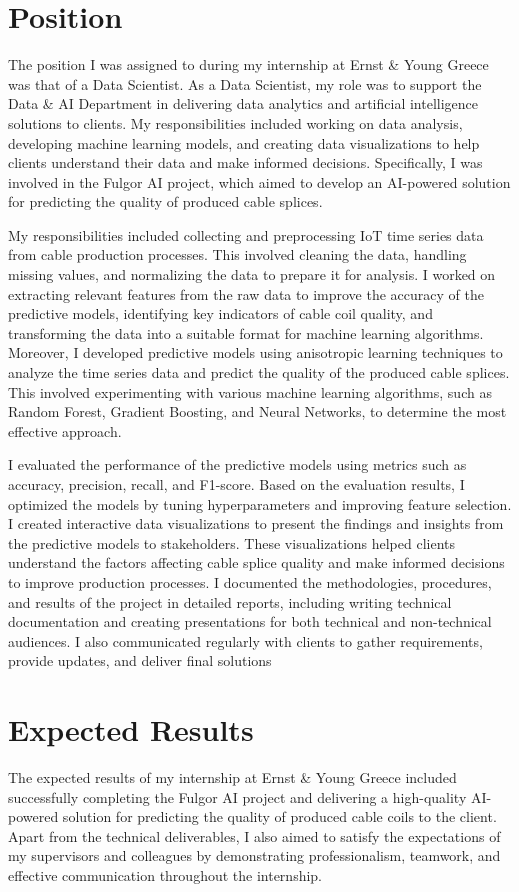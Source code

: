 \section{Position}

The position I was assigned to during my internship at Ernst \& Young Greece
was that of a Data Scientist. As a Data Scientist, my role was to support the
Data \& AI Department in delivering data analytics and artificial intelligence
solutions to clients. My responsibilities included working on data analysis,
developing machine learning models, and creating data visualizations to help
clients understand their data and make informed decisions. Specifically, I was
involved in the Fulgor AI project, which aimed to develop an AI-powered
solution for predicting the quality of produced cable splices.

My responsibilities included collecting and preprocessing IoT time series data
from cable production processes. This involved cleaning the data, handling
missing values, and normalizing the data to prepare it for analysis. I worked
on extracting relevant features from the raw data to improve the accuracy of
the predictive models, identifying key indicators of cable coil quality, and
transforming the data into a suitable format for machine learning algorithms.
Moreover, I developed predictive models using anisotropic learning techniques
to analyze the time series data and predict the quality of the produced cable
splices. This involved experimenting with various machine learning algorithms,
such as Random Forest, Gradient Boosting, and Neural Networks, to determine the
most effective approach.

I evaluated the performance of the predictive models using metrics such as
accuracy, precision, recall, and F1-score. Based on the evaluation results, I
optimized the models by tuning hyperparameters and improving feature selection.
I created interactive data visualizations to present the findings and insights
from the predictive models to stakeholders. These visualizations helped clients
understand the factors affecting cable splice quality and make informed
decisions to improve production processes. I documented the methodologies,
procedures, and results of the project in detailed reports, including writing
technical documentation and creating presentations for both technical and
non-technical audiences. I also communicated regularly with clients to gather
requirements, provide updates, and deliver final solutions

\section{Expected Results}

The expected results of my internship at Ernst \& Young Greece included
successfully completing the Fulgor AI project and delivering a high-quality
AI-powered solution for predicting the quality of produced cable coils to the
client. Apart from the technical deliverables, I also aimed to satisfy the
expectations of my supervisors and colleagues by demonstrating professionalism,
teamwork, and effective communication throughout the internship.
